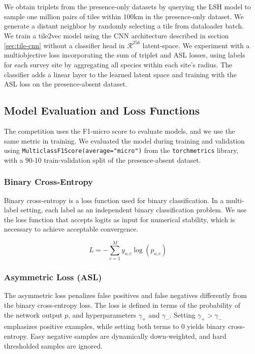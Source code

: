 We obtain triplets from the presence-only datasets by querying the LSH model to sample one million pairs of tiles within 100km in the presence-only dataset.
We generate a distant neighbor by randomly selecting a tile from dataloader batch.
We train a tile2vec model using the CNN architecture described in section \ref{sec:tile-cnn} without a classifier head in $\mathcal{R}^{256}$ latent-space.
We experiment with a multiobjective loss incorporating the sum of triplet and ASL losses, using labels for each survey site by aggregating all species within each site's radius.
The classifier adds a linear layer to the learned latent space and training with the ASL loss on the presence-absent dataset.

\subsection{Model Evaluation and Loss Functions}

The competition uses the F1-micro score to evaluate models, and we use the same metric in training.
We evaluated the model during training and validation using \texttt{MulticlassF1Score(average="micro")} from the \texttt{torchmetrics} library, with a 90-10 train-validation split of the presence-absent dataset.

\subsubsection{Binary Cross-Entropy}

Binary cross-entropy is a loss function used for binary classification.
In a multi-label setting, each label as an independent binary classification problem.
We use the loss function that accepts logits as input for numerical stability, which is necessary to achieve acceptable convergence.

\begin{equation}
L = -\sum_{c=1}^My_{o,c}\log(p_{o,c})
\end{equation}

\subsubsection{Asymmetric Loss (ASL)}

The asymmetric loss \cite{ridnik2021asymmetric} penalizes false positives and false negatives differently from the binary cross-entropy loss.
The loss is defined in terms of the probability of the network output $p$, and hyperparameters $\gamma_{+}$ and $\gamma_{-}$.
Setting $\gamma_{+} > \gamma_{-}$ emphasizes positive examples, while setting both terms to 0 yields binary cross-entropy.
Easy negative samples are dynamically down-weighted, and hard thresholded samples are ignored.

